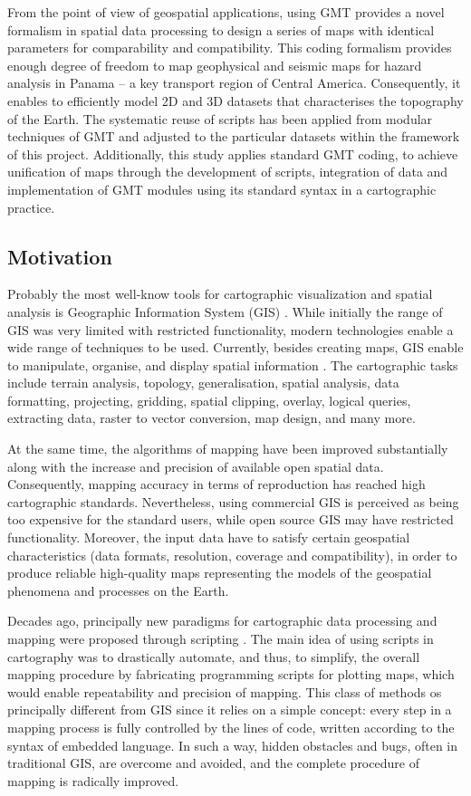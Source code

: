 \documentclass[USenglish,twocolumn]{article}
\begin{document}
From the point of view of geospatial applications, using GMT provides a novel formalism in spatial data processing to design a series of maps with identical parameters for comparability and compatibility. This coding formalism provides enough degree of freedom to map geophysical and seismic maps for hazard analysis in Panama -- a key transport region of Central America. Consequently, it enables to efficiently model 2D and 3D datasets that characterises the topography of the Earth. The systematic reuse of scripts has been applied from modular techniques of GMT and adjusted to the particular datasets within the framework of this project. Additionally, this study applies standard GMT coding, to achieve unification of maps through the development of scripts, integration of data and implementation of GMT modules using its standard syntax in a cartographic practice.

\subsection{Motivation}
Probably the most well-know tools for cartographic visualization and spatial analysis is Geographic Information System (GIS) \citep{Longley,Harvey}. While initially the range of GIS was very limited with restricted functionality, modern technologies enable a wide range of techniques to be used. Currently, besides creating maps, GIS enable to manipulate, organise, and display spatial information \citep{LAMONT1997469}. The cartographic tasks include terrain analysis, topology, generalisation, spatial analysis, data formatting, projecting, gridding, spatial clipping, overlay, logical queries,  extracting data, raster to vector conversion, map design, and many more. 

At the same time, the algorithms of mapping have been improved substantially along with the increase and precision of available open spatial data. Consequently, mapping accuracy in terms of reproduction has reached high cartographic standards. Nevertheless, using commercial GIS is perceived as being too expensive for the standard users, while open source GIS may have restricted functionality. Moreover, the input data have to satisfy certain geospatial characteristics (data formats, resolution, coverage and compatibility), in order to produce reliable high-quality maps representing the models of the geospatial phenomena and processes on the Earth.

Decades ago, principally new paradigms for cartographic data processing and mapping were proposed through scripting \citep{WesselSmith1998,Neteler2004,Neteler2008}. The main idea of using scripts in cartography was to drastically automate, and thus, to simplify, the overall mapping procedure by fabricating programming scripts for plotting maps, which would enable repeatability and precision of mapping. This class of methods os principally different from GIS since it relies on a simple concept: every step in a mapping process is fully controlled by the lines of code, written according to the syntax of embedded language. In such a way, hidden obstacles and bugs, often in traditional GIS, are overcome and avoided, and the complete procedure of mapping is radically improved.
\end{document}
